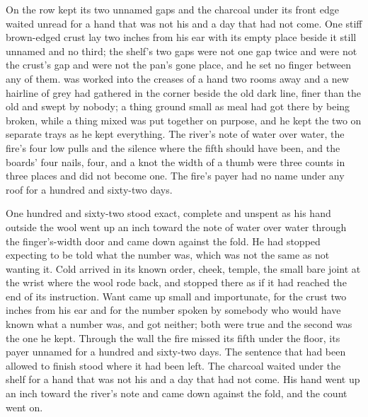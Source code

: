 On  the row kept its two unnamed gaps and the charcoal under its front edge waited unread for a hand that was not his and a day that had not come. One stiff brown-edged crust lay two inches from his ear with its empty place beside it still unnamed and no third; the shelf's two gaps were not one gap twice and were not the crust's gap and were not the pan's gone place, and he set no finger between any of them.  was worked into the creases of a hand two rooms away and a new hairline of grey had gathered in the corner beside the old dark line, finer than the old and swept by nobody; a thing ground small as meal had got there by being broken, while a thing mixed was put together on purpose, and he kept the two on separate trays as he kept everything. The river's note of water over water, the fire's four low pulls and the silence where the fifth should have been, and the boards' four nails, four, and a knot the width of a thumb were three counts in three places and did not become one. The fire's payer had no name under any roof for a hundred and sixty-two days.

One hundred and sixty-two stood exact, complete and unspent as his hand outside the wool went up an inch toward the note of water over water through the finger's-width door and came down against the fold. He had stopped expecting to be told what the number was, which was not the same as not wanting it. Cold arrived in its known order, cheek, temple, the small bare joint at the wrist where the wool rode back, and stopped there as if it had reached the end of its instruction. Want came up small and importunate, for the crust two inches from his ear and for the number spoken by somebody who would have known what a number was, and got neither; both were true and the second was the one he kept. Through the wall the fire missed its fifth under the floor, its payer unnamed for a hundred and sixty-two days. The sentence that had been allowed to finish stood where it had been left. The charcoal waited under the shelf for a hand that was not his and a day that had not come. His hand went up an inch toward the river's note and came down against the fold, and the count went on.
